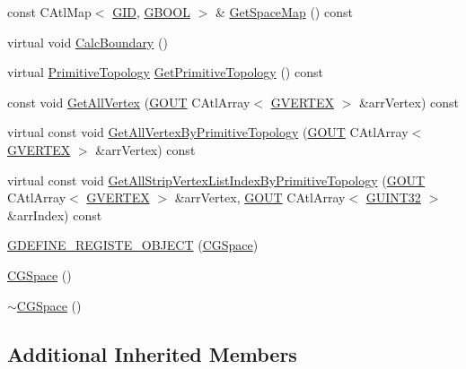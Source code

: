 \begin{DoxyCompactItemize}
\item 
const C\+Atl\+Map$<$ \hyperlink{_g_types_8h_a5b96ecb16d8e437977d12cd40aa6f6d8}{G\+I\+D}, \hyperlink{_g_types_8h_a2901915743626352a6820c5405f556dc}{G\+B\+O\+O\+L} $>$ \& \hyperlink{class_c_g_space_a154057c3b7e9812c886348b66d36863d}{Get\+Space\+Map} () const 
\item 
virtual void \hyperlink{class_c_g_space_a8ccaa8a6e0b17f5b37c89ad21c35c98f}{Calc\+Boundary} ()
\item 
virtual \hyperlink{_g_types_8h_a940e3da6a9b57aae3de0b050e2a7af5e}{Primitive\+Topology} \hyperlink{class_c_g_space_acf43525c645839d56b678ba9c0a007ed}{Get\+Primitive\+Topology} () const 
\item 
const void \hyperlink{class_c_g_space_aea6ca1ceccafdcf639bdf1aba1d54522}{Get\+All\+Vertex} (\hyperlink{_g_types_8h_a0858ec221262e635612871d70ca233ad}{G\+O\+U\+T} C\+Atl\+Array$<$ \hyperlink{struct_g_v_e_r_t_e_x}{G\+V\+E\+R\+T\+E\+X} $>$ \&arr\+Vertex) const 
\item 
virtual const void \hyperlink{class_c_g_space_ae79f82d62452acb3b38f33aed1c1bb74}{Get\+All\+Vertex\+By\+Primitive\+Topology} (\hyperlink{_g_types_8h_a0858ec221262e635612871d70ca233ad}{G\+O\+U\+T} C\+Atl\+Array$<$ \hyperlink{struct_g_v_e_r_t_e_x}{G\+V\+E\+R\+T\+E\+X} $>$ \&arr\+Vertex) const 
\item 
virtual const void \hyperlink{class_c_g_space_a7059b7ff20b24aedabe611964c2e4748}{Get\+All\+Strip\+Vertex\+List\+Index\+By\+Primitive\+Topology} (\hyperlink{_g_types_8h_a0858ec221262e635612871d70ca233ad}{G\+O\+U\+T} C\+Atl\+Array$<$ \hyperlink{struct_g_v_e_r_t_e_x}{G\+V\+E\+R\+T\+E\+X} $>$ \&arr\+Vertex, \hyperlink{_g_types_8h_a0858ec221262e635612871d70ca233ad}{G\+O\+U\+T} C\+Atl\+Array$<$ \hyperlink{_g_types_8h_a2e1a1c77d1349057202e2f34e071019c}{G\+U\+I\+N\+T32} $>$ \&arr\+Index) const 
\item 
\hyperlink{class_c_g_space_ad67fd9ee3407400625a458fb203152ec}{G\+D\+E\+F\+I\+N\+E\+\_\+\+R\+E\+G\+I\+S\+T\+E\+\_\+\+O\+B\+J\+E\+C\+T} (\hyperlink{class_c_g_space}{C\+G\+Space})
\item 
\hyperlink{class_c_g_space_a5713060b1ea9a2340a3cf0c42096cb6c}{C\+G\+Space} ()
\item 
\hyperlink{class_c_g_space_a775a8a4104dd05bd8f3af5b27fbf32dc}{$\sim$\+C\+G\+Space} ()
\end{DoxyCompactItemize}
\subsection*{Additional Inherited Members}


